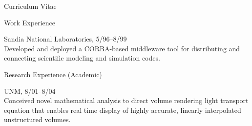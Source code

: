 \documentclass{article}
\begin{document}
\begin{cv}{Curriculum Vitae}
\begin{cvlist}{Work Experience}
    \item[Product Realization Environment]\hfill Sandia National Laboratories,
      5/96--8/99 \\
      Developed and deployed a CORBA-based middleware tool for distributing
      and connecting scientific modeling and simulation codes.
    \end{cvlist}

    \begin{cvlist}{Research Experience (Academic)}
    \item[Doctoral Research] UNM, 8/01--8/04 \\
      Conceived novel mathematical analysis to direct volume rendering
      light transport equation that enables real time display of highly
      accurate, linearly interpolated unstructured volumes.
    \end{cvlist}


\end{cv}
\end{document}
